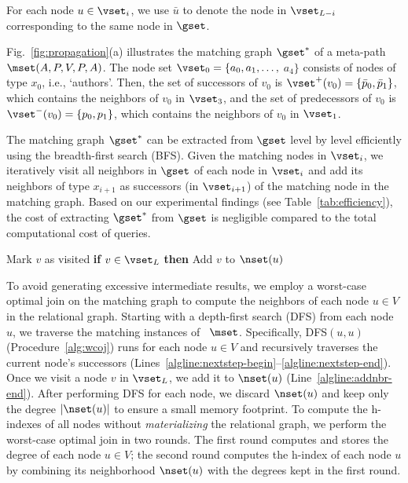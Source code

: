 For each node $u\in\vset_i$, we use $\bar{u}$ to denote the node in $\vset_{L-i}$ corresponding to the same node in $\gset$.

\begin{example}
  Fig.~\ref{fig:propagation}(a) illustrates the matching graph $\gset^*$ of a meta-path $\mset(A, P, V, P, A)$.
  The node set $\vset_0=\{a_0, a_1, \dots,$ $a_4\}$ consists of nodes of type $x_0$, i.e., `authors'.
  Then, the set of successors of $v_0$ is $\vset^+(v_0)=\{\bar{p}_0, \bar{p}_1\}$, which contains the neighbors of $v_0$ in $\vset_3$, and the set of predecessors of $v_0$ is $\vset^-(v_0)=\{p_0, p_1\}$, which contains the neighbors of $v_0$ in $\vset_1$.
\end{example}

The matching graph $\gset^*$ can be extracted from $\gset$ level by level efficiently using the breadth-first search (BFS).
Given the matching nodes in $\vset_i$, we iteratively visit all neighbors in $\gset$ of each node in $\vset_i$ and add its neighbors of type $x_{i+1}$ as successors (in $\vset_{i+1}$) of the matching node in the matching graph.
Based on our experimental findings (see Table~\ref{tab:efficiency}), the cost of extracting $\gset^*$ from $\gset$ is negligible compared to the total computational cost of \ced queries.

\begin{procedure}[t]
\caption{DFS($u,v$)}
\label{alg:wcoj}
    \LinesNumbered
    Mark $v$ as visited\;
    \textbf{if} $v \in \vset_{L}$ \textbf{then} Add $v$ to $\nset(u)$\;\label{algline:addnbr-end}
\end{procedure}

To avoid generating excessive intermediate results, we employ a worst-case optimal join on the matching graph to compute the neighbors of each node $u \in V$ in the relational graph.
Starting with a depth-first search (DFS) from each node $u$, we traverse the matching instances of~ $\mset$.
Specifically, DFS$(u, u)$ (Procedure~\ref{alg:wcoj}) runs for each node $u \in V$ and recursively traverses the current node's successors (Lines~\ref{algline:nextstep-begin}--\ref{algline:nextstep-end}).
Once we visit a node $v$ in $\vset_L$, we add it to $\nset(u)$ (Line~\ref{algline:addnbr-end}).
After performing DFS for each node, we discard $\nset(u)$ and keep only the degree $|\nset(u)|$ to ensure a small memory footprint.
To compute the h-indexes of all nodes without \emph{materializing} the relational graph, we perform the worst-case optimal join in two rounds.
The first round computes and stores the degree of each node $u \in V$; the second round computes the h-index of each node $u$ by combining its neighborhood $\nset(u)$ with the degrees kept in the first round.


